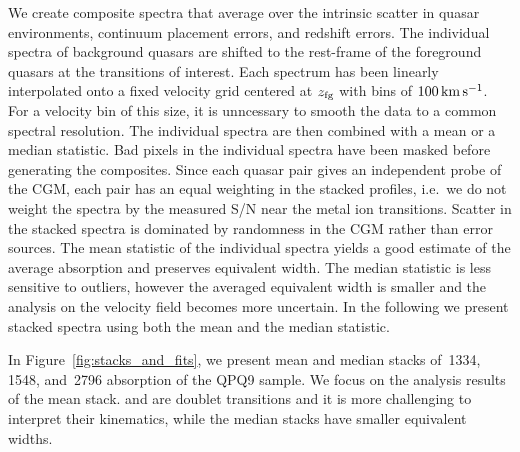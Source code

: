 \documentclass[iop]{emulateapj}
\begin{document}
We create composite spectra that average over the intrinsic scatter in quasar environments, 
continuum placement errors, and redshift errors. The individual spectra of background quasars are 
shifted to the rest-frame of the foreground quasars at the transitions of interest. Each spectrum 
has been linearly interpolated onto a fixed velocity grid centered at $z_{\rm fg}$ with bins of 
$100\,{\rm km\,s^{-1}}$. For a velocity bin of this size, it is unncessary to smooth the data to a 
common spectral resolution. The individual spectra are then combined with a mean or a median 
statistic. Bad pixels in the individual spectra have been masked before generating the 
composites. Since each quasar pair gives an independent probe of the CGM, each pair has an equal 
weighting in the stacked profiles, i.e.\ we do not weight the spectra by the measured S/N near the 
metal ion transitions. Scatter in the stacked spectra is dominated by randomness in the CGM rather 
than error sources. The mean statistic of the individual spectra yields a good estimate of the 
average absorption and preserves equivalent width. The median statistic is less sensitive to 
outliers, however the averaged equivalent width is smaller and the analysis on the velocity field 
becomes more uncertain. In the following we present stacked spectra using both the mean and the 
median statistic. 


In Figure~\ref{fig:stacks_and_fits}, we present mean and median stacks of \,1334, 
\,1548, and \,2796 absorption of the QPQ9 sample. We focus on the 
analysis results of the  mean stack.  and  are doublet transitions 
and it is more challenging to interpret their kinematics, while the median stacks have smaller 
equivalent widths.  

\end{document}

